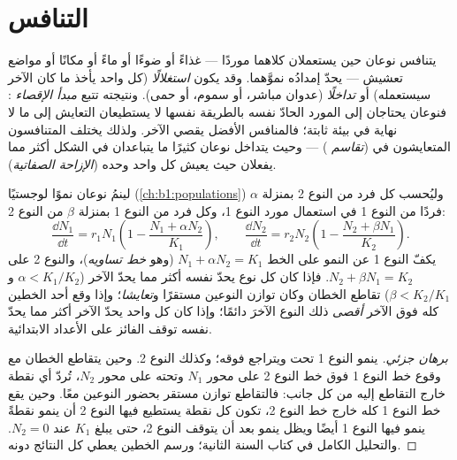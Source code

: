 \section{التنافس}

\begin{definition}\label{def:b1:species-interactions:competition}
يتنافس نوعان حين يستعملان كلاهما موردًا --- غذاءً أو ضوءًا أو
ماءً أو مكانًا أو مواضع تعشيش --- يحدّ إمدادُه نموَّهما.
وقد يكون  \emph{استغلالًا} (كل واحد يأخذ ما كان الآخر
سيستعمله) أو \emph{تداخلًا} (عدوان مباشر، أو سموم،
أو حمى). ونتيجته تتبع \emph{مبدأ الإقصاء
}: فنوعان يحتاجان إلى المورد الحادّ نفسه بالطريقة
نفسها لا يستطيعان التعايش إلى ما لا نهاية في بيئة ثابتة؛
فالمنافس الأفضل يقصي الآخر. ولذلك يختلف المتنافسون المتعايشون
في  (\emph{تقاسم }) --- وحيث يتداخل نوعان
كثيرًا ما يتباعدان في الشكل أكثر مما يفعلان حيث يعيش كل واحد
وحده (\emph{الإزاحة الصفاتية}).
\end{definition}

\begin{proposition}\label{prop:b1:species-interactions:lotka}
لينمُ نوعان نموًا لوجستيًا (\cref{ch:b1:populations}) وليُحسب
كل فرد من النوع 2 بمنزلة $\alpha$ فردًا من النوع
1 في استعمال مورد النوع 1، وكل فرد من النوع 1 بمنزلة $\beta$
من النوع 2:
\[
\frac{\dd N_1}{\dd t} = r_1 N_1\left(1 - \frac{N_1 + \alpha N_2}{K_1}\right),
\qquad
\frac{\dd N_2}{\dd t} = r_2 N_2\left(1 - \frac{N_2 + \beta N_1}{K_2}\right).
\]
يكفّ النوع 1 عن النمو على الخط $N_1 + \alpha N_2 = K_1$ (وهو
\emph{خط تساويه})، والنوع 2 على $N_2 + \beta N_1 = K_2$.
فإذا كان كل نوع يحدّ نفسه أكثر مما يحدّ الآخر ($\alpha <
K_1/K_2$ و$\beta < K_2/K_1$) تقاطع الخطان وكان توازن
النوعين مستقرًا و\emph{تعايشا}؛ وإذا وقع أحد الخطين
كله فوق الآخر \emph{أقصى} ذلك النوع الآخرَ دائمًا؛
وإذا كان كل واحد يحدّ الآخر أكثر مما يحدّ نفسه توقف الفائز
على الأعداد الابتدائية.
\end{proposition}
\begin{proof}[برهان جزئي]
ينمو النوع 1 تحت  ويتراجع فوقه؛ وكذلك النوع 2.
وحين يتقاطع الخطان مع وقوع خط النوع 1 فوق خط النوع
2 على محور $N_1$ وتحته على محور $N_2$، تُردّ أي نقطة خارج
التقاطع إليه من كل جانب: فالتقاطع
توازن مستقر بحضور النوعين معًا. وحين يقع خط النوع 1
كله خارج خط النوع 2، تكون كل نقطة يستطيع فيها النوع
2 أن ينمو نقطةً ينمو فيها النوع 1 أيضًا ويظل ينمو
بعد أن يتوقف النوع 2، حتى يبلغ $K_1$ عند
$N_2 = 0$. والتحليل الكامل في كتاب السنة الثانية؛ ورسم
الخطين يعطي كل النتائج دونه.
\end{proof}

